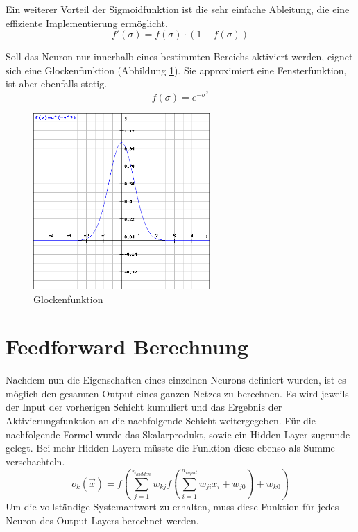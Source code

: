 Ein weiterer Vorteil der Sigmoidfunktion ist die sehr einfache Ableitung, die eine effiziente Implementierung ermöglicht.
\begin{equation}
f'(\sigma) = f(\sigma)\cdot (1- f(\sigma))
\end{equation}

Soll das Neuron nur innerhalb eines bestimmten Bereichs aktiviert werden, eignet sich eine Glockenfunktion (Abbildung  \ref{glocke}). Sie approximiert eine Fensterfunktion, ist aber ebenfalls stetig.
\begin{equation}
f(\sigma) = e^{-\sigma^2}
\end{equation}
\begin{figure}[h]
\centering
\includegraphics[width=0.6\textwidth]{pictures/glocke.png}
\caption{Glockenfunktion}
\label{glocke}
\end{figure}

\section{Feedforward Berechnung}
Nachdem nun die Eigenschaften eines einzelnen Neurons definiert wurden, ist es möglich den gesamten Output eines ganzen Netzes zu berechnen.  Es wird jeweils der Input der vorherigen Schicht kumuliert und das Ergebnis der Aktivierungsfunktion an die nachfolgende Schicht weitergegeben. Für die nachfolgende Formel wurde das Skalarprodukt, sowie ein Hidden-Layer zugrunde gelegt. Bei mehr Hidden-Layern müsste die Funktion diese ebenso als Summe verschachteln.
\begin{equation}
o_{k}(\vec{x})=f\left( \sum_{j=1}^{n_{hidden}} w_{kj} f\left(\sum_{i=1}^{n_{input}} w_{ji}x_{i}+w_{j0} \right)+w_{k0} \right)
\label{eq:o}
\end{equation}
Um die vollständige Systemantwort zu erhalten, muss diese Funktion für jedes Neuron des Output-Layers berechnet werden.

